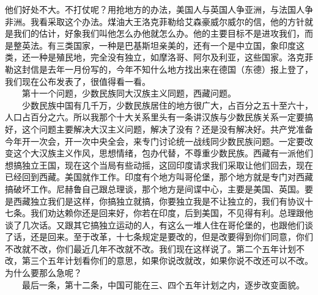 \documentclass[cn,11pt,chinese]{elegantbook}
\begin{document}
他们好处不大。不打仗呢？用抢地方的办法，美国人与英国人争亚洲，与法国人争非洲。我看采取这个办法。煤油大王洛克菲勒给艾森豪威尔威尔的信，他的方针就是我们的估计，好象我们叫他怎么办他就怎么办。他的主要目标不是进攻我们，而是整英法。有三类国家，一种是巴基斯坦亲美的，还有一个是中立国，象印度这类，还一种是殖民地，完全没有独立，如摩洛哥、阿尔及利亚，这些国家。洛克菲勒这封信是去年一月份写的，今年不知什么地方找出来在德国（东德）报上登了，我们现在公布发表了，很值得看一看。\\
　　第十一个问题，少数民族同大汉族主义同题，西藏问题。\\
　　少数民族中国有几千万，少数民族居住的地方很广大，占百分之五十至六十，人口占百分之六。所以我那个十大关系里头有一条讲汉族与少数民族关系一定要搞好，这个问题主要解决大汉主义问题，解决了没有？还是没有解决好。共产党准备今年开一次会，开一次中央全会，来专门讨论统一战线同少数民族问题。一定要改变这个大汉族主义作风，思想情绪，包办代替，不尊重少数民族。西藏有一派他们想搞独立王国，现在这个当局有些动摇，这回印度请求我们采取让他们回去，现在已经回到西藏。美国就作工作。印度有个地方叫哥伦堡，那个地方就是专门对西藏搞破坏工作。尼赫鲁自己跟总理谈，那个地方是间谍中心，主要是美国、英国。要是西藏独立我们是这样，你搞独立就搞，你要独立我是不让独立的，我们有协议十七条。我们劝达赖你还是回来好，你若在印度，后到美国，不见得有利。总理跟他谈了几次话。又跟其它搞独立运动的人，有这么一堆人住在哥伦堡的，也跟他们谈了话，还是回来。至于改革，十七条规定是要改的，但是改要得到你们同意，你们不改就不改，你们最近几年不改就不改。我们现在这样说了。第二个五年计划不改，第三个五年计划看你们的意思，如果你说改就改，如果你说不改还可以不改。为什么要那么急呢？\\
　　最后一条，第十二条，中国可能在三、四个五年计划之内，逐步改变面貌。\\
\end{document}
